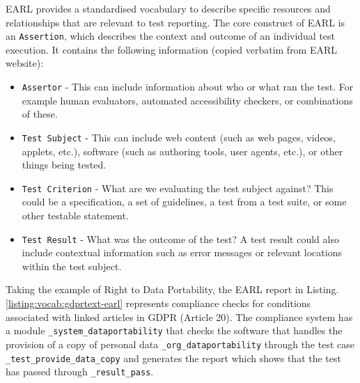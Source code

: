 EARL provides a standardised vocabulary to describe specific resources and relationships that are relevant to test reporting. The core construct of EARL is an \texttt{Assertion}, which describes the context and outcome of an individual test execution. It contains the following information (copied verbatim from EARL website):

\begin{itemize}
    \item \texttt{Assertor} - This can include information about who or what ran the test. For example human evaluators, automated accessibility checkers, or combinations of these.
    \item \texttt{Test Subject} - This can include web content (such as web pages, videos, applets, etc.), software (such as authoring tools, user agents, etc.), or other things being tested.
    \item \texttt{Test Criterion} - What are we evaluating the test subject against? This could be a specification, a set of guidelines, a test from a test suite, or some other testable statement.
    \item \texttt{Test Result} - What was the outcome of the test? A test result could also include contextual information such as error messages or relevant locations within the test subject.
\end{itemize}

Taking the example of Right to Data Portability, the EARL report in Listing.\ref{listing:vocab:gdprtext-earl} represents compliance checks for conditions associated with linked articles in GDPR (Article 20). The compliance system has a module \texttt{\_system\_dataportability} that checks the software that handles the provision of a copy of personal data \texttt{\_org\_dataportability} through the test case \texttt{\_test\_provide\_data\_copy} and generates the report which shows that the test has passed through \texttt{\_result\_pass}.


